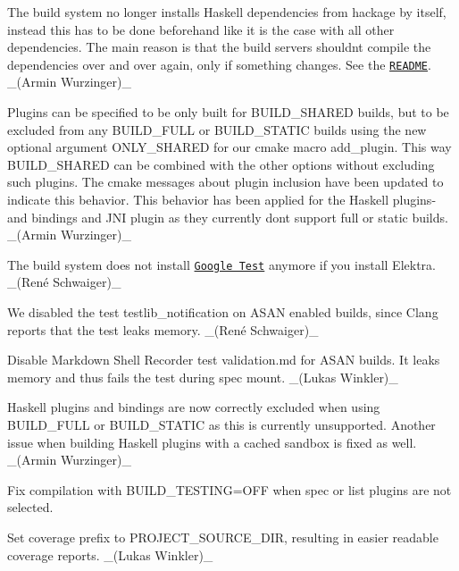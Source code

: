 \begin{DoxyItemize}
\item The build system no longer installs Haskell dependencies from hackage by itself, instead this has to be done beforehand like it is the case with all other dependencies. The main reason is that the build servers shouldn\textquotesingle{}t compile the dependencies over and over again, only if something changes. See the \href{https://www.libelektra.org/bindings/haskell}{\tt R\+E\+A\+D\+ME}. \+\_\+(\+Armin Wurzinger)\+\_\+
\item Plugins can be specified to be only built for {\ttfamily B\+U\+I\+L\+D\+\_\+\+S\+H\+A\+R\+ED} builds, but to be excluded from any {\ttfamily B\+U\+I\+L\+D\+\_\+\+F\+U\+LL} or {\ttfamily B\+U\+I\+L\+D\+\_\+\+S\+T\+A\+T\+IC} builds using the new optional argument {\ttfamily O\+N\+L\+Y\+\_\+\+S\+H\+A\+R\+ED} for our cmake macro {\ttfamily add\+\_\+plugin}. This way {\ttfamily B\+U\+I\+L\+D\+\_\+\+S\+H\+A\+R\+ED} can be combined with the other options without excluding such plugins. The cmake messages about plugin inclusion have been updated to indicate this behavior. This behavior has been applied for the Haskell plugins-\/ and bindings and J\+NI plugin as they currently don\textquotesingle{}t support full or static builds. \+\_\+(\+Armin Wurzinger)\+\_\+
\item The build system does not install \href{https://github.com/google/googletest}{\tt Google Test} anymore if you install Elektra. \+\_\+(René Schwaiger)\+\_\+
\item We disabled the test {\ttfamily testlib\+\_\+notification} on A\+S\+AN enabled builds, since Clang reports that the test leaks memory. \+\_\+(René Schwaiger)\+\_\+
\item Disable Markdown Shell Recorder test {\ttfamily validation.\+md} for A\+S\+AN builds. It leaks memory and thus fails the test during spec mount. \+\_\+(\+Lukas Winkler)\+\_\+
\item Haskell plugins and bindings are now correctly excluded when using {\ttfamily B\+U\+I\+L\+D\+\_\+\+F\+U\+LL} or {\ttfamily B\+U\+I\+L\+D\+\_\+\+S\+T\+A\+T\+IC} as this is currently unsupported. Another issue when building Haskell plugins with a cached sandbox is fixed as well. \+\_\+(\+Armin Wurzinger)\+\_\+
\item Fix compilation with {\ttfamily B\+U\+I\+L\+D\+\_\+\+T\+E\+S\+T\+I\+NG=O\+FF} when {\ttfamily spec} or {\ttfamily list} plugins are not selected.
\item Set coverage prefix to {\ttfamily P\+R\+O\+J\+E\+C\+T\+\_\+\+S\+O\+U\+R\+C\+E\+\_\+\+D\+IR}, resulting in easier readable coverage reports. \+\_\+(\+Lukas Winkler)\+\_\+

\end{DoxyItemize}
